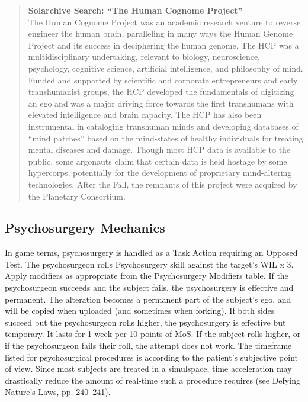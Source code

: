 \begin{quotation}
\textbf{Solarchive Search: “The Human Cognome Project” }
\\
The Human Cognome Project was an
academic research venture to reverse
engineer the human brain, paralleling
in many ways the Human Genome
Project and its success in deciphering
the human genome. The HCP was a
multidisciplinary undertaking, relevant
to biology, neuroscience, psychology,
cognitive science, artificial intelligence,
and philosophy of mind.
Funded and supported by scientific
and corporate entrepreneurs and early
transhumanist groups, the HCP developed
the fundamentals of digitizing an ego
and was a major driving force towards
the first transhumans with elevated
intelligence and brain capacity. The HCP
has also been instrumental in cataloging
transhuman minds and developing
databases of “mind patches” based on
the mind-states of healthy individuals for
treating mental diseases and damage.
Though most HCP data is available to the
public, some argonauts claim that certain
data is held hostage by some hypercorps,
potentially for the development of proprietary
mind-altering technologies.
After the Fall, the remnants of this
project were acquired by the Planetary
Consortium.
\end{quotation}

\subsection{Psychosurgery Mechanics}
In game terms, psychosurgery is handled as a Task
Action requiring an Opposed Test. The psychosurgeon
rolls Psychosurgery skill against the target’s WIL x 3.
Apply modifiers as appropriate from the Psychosurgery
Modifiers table.
If the psychosurgeon succeeds and the subject fails,
the psychosurgery is effective and permanent. The
alteration becomes a permanent part of the subject’s
ego, and will be copied when uploaded (and sometimes
when forking).
If both sides succeed but the psychosurgeon rolls
higher, the psychosurgery is effective but temporary. It
lasts for 1 week per 10 points of MoS.
If the subject rolls higher, or if the psychosurgeon
fails their roll, the attempt does not work.
The timeframe listed for psychosurgical procedures
is according to the patient’s subjective point of view.
Since most subjects are treated in a simulspace, time
acceleration may drastically reduce the amount of
real-time such a procedure requires (see Defying Nature’s
Laws, pp. 240–241).


